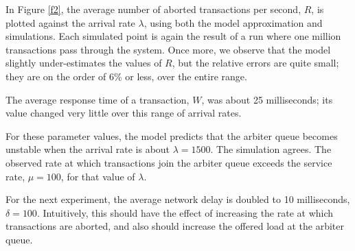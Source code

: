 \documentclass[runningheads]{llncs}
\begin{document}
In Figure \ref{f2}, the average number of aborted transactions per second, $R$,
is plotted against the arrival rate $\lambda$, using both the model approximation
and simulations. Each simulated point is again the result of a run where one
million transactions pass through the system. Once more, we observe that the model
slightly under-estimates the values of $R$, but the relative errors are quite small;
they are on the order of 6\% or less, over the entire range.

The average response time of a transaction, $W$, was about 25 milliseconds; its
value changed very little over this range of arrival rates.

For these parameter values, the model predicts that the arbiter queue becomes
unstable when the arrival rate is about $\lambda = 1500$. The simulation
agrees. The observed rate at which transactions join the arbiter queue exceeds
the service rate, $\mu = 100$, for that value of $\lambda$.

For the next experiment, the average network delay is doubled to 10 milliseconds,
$\delta = 100$. Intuitively, this should have the effect of increasing the rate
at which transactions are aborted, and also should increase the offered load at
the arbiter queue.
\end{document}
